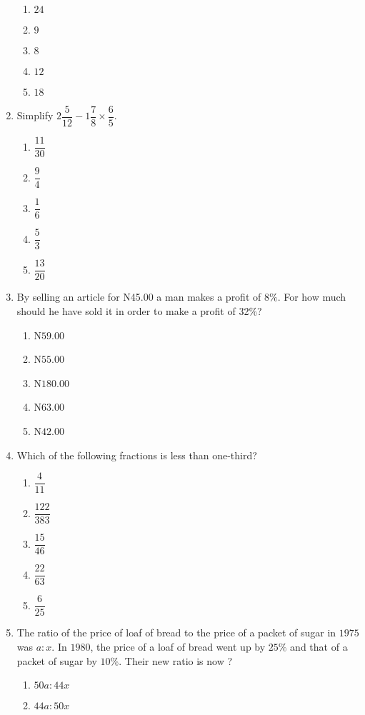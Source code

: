 \begin{multicols}{2}
\begin{enumerate}[label={\arabic*.}]
\begin{enumerate}[label={\Alph*.}]
    \item \(24\)
    \item \(9\)
    \item \(8\)
    \item \(12\)
    \item \(18\)
    \end{enumerate}
\item Simplify \(2{\dfrac{5}{12}} - 1{\dfrac{7}{8}} \times \dfrac{6}{5}\).
    \begin{enumerate}[label={\Alph*.}]
    \item \(\dfrac{11}{30}\)
    \item \(\dfrac{9}{4}\)
    \item \(\dfrac{1}{6}\)
    \item \(\dfrac{5}{3}\)
    \item \(\dfrac{13}{20}\)
    \end{enumerate}
\item By selling an article for N45.00 a man makes a profit of \(8\%\). For how much should he have sold it in order to make a profit of 32\%? 
    \begin{enumerate}[label={\Alph*.}]
    \item N\(59.00\)
    \item N\(55.00\)
    \item N\(180.00\)
    \item N\(63.00\)
    \item N\(42.00\)
    \end{enumerate}
\item Which of the following fractions is less than one-third?
    \begin{enumerate}[label={\Alph*.}]
    \item \(\dfrac{4}{11}\)
    \item \(\dfrac{122}{383}\)
    \item \(\dfrac{15}{46}\)
    \item \(\dfrac{22}{63}\)
    \item \(\dfrac{6}{25}\)
    \end{enumerate}
\item The ratio of the price of loaf of bread to the price of a packet of sugar in \(1975\) was \(a:x\). In \(1980\), the price of a loaf of bread went up by \(25\%\) and that of a packet of sugar by \(10\%\). Their new ratio is now ?
    \begin{enumerate}[label={\Alph*.}]
    \item \(50a:44x\)
    \item \(44a:50x\)

\end{enumerate}
\end{enumerate}
\end{multicols}
